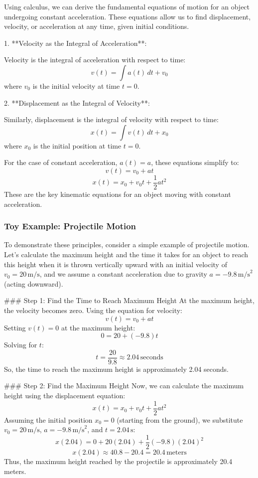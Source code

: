 \documentclass{article}
\begin{document}
Using calculus, we can derive the fundamental equations of motion for an object undergoing constant acceleration. These equations allow us to find displacement, velocity, or acceleration at any time, given initial conditions.

1. **Velocity as the Integral of Acceleration**:
   
   Velocity is the integral of acceleration with respect to time:
   \[
   v(t) = \int a(t) \, dt + v_0
   \]
   where \(v_0\) is the initial velocity at time \(t = 0\).

2. **Displacement as the Integral of Velocity**:
   
   Similarly, displacement is the integral of velocity with respect to time:
   \[
   x(t) = \int v(t) \, dt + x_0
   \]
   where \(x_0\) is the initial position at time \(t = 0\).

For the case of constant acceleration, \(a(t) = a\), these equations simplify to:
\[
v(t) = v_0 + at
\]
\[
x(t) = x_0 + v_0 t + \frac{1}{2} a t^2
\]
These are the key kinematic equations for an object moving with constant acceleration.

\subsubsection*{Toy Example: Projectile Motion}

To demonstrate these principles, consider a simple example of projectile motion. Let’s calculate the maximum height and the time it takes for an object to reach this height when it is thrown vertically upward with an initial velocity of \(v_0 = 20 \, \text{m/s}\), and we assume a constant acceleration due to gravity \(a = -9.8 \, \text{m/s}^2\) (acting downward).

### Step 1: Find the Time to Reach Maximum Height
At the maximum height, the velocity becomes zero. Using the equation for velocity:
\[
v(t) = v_0 + at
\]
Setting \(v(t) = 0\) at the maximum height:
\[
0 = 20 + (-9.8)t
\]
Solving for \(t\):
\[
t = \frac{20}{9.8} \approx 2.04 \, \text{seconds}
\]
So, the time to reach the maximum height is approximately 2.04 seconds.

### Step 2: Find the Maximum Height
Now, we can calculate the maximum height using the displacement equation:
\[
x(t) = x_0 + v_0 t + \frac{1}{2} a t^2
\]
Assuming the initial position \(x_0 = 0\) (starting from the ground), we substitute \(v_0 = 20 \, \text{m/s}\), \(a = -9.8 \, \text{m/s}^2\), and \(t = 2.04 \, \text{s}\):
\[
x(2.04) = 0 + 20(2.04) + \frac{1}{2}(-9.8)(2.04)^2
\]
\[
x(2.04) \approx 40.8 - 20.4 = 20.4 \, \text{meters}
\]
Thus, the maximum height reached by the projectile is approximately 20.4 meters.
\end{document}
